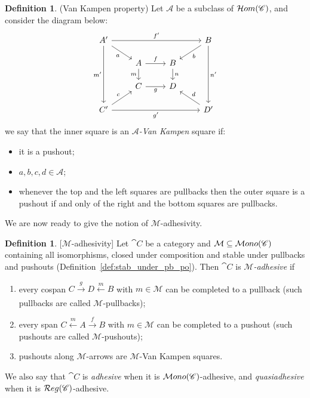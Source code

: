 \documentclass[a4paper, twoside,openright]{report}
\theoremstyle{plain}
\theoremstyle{definition}
\newtheorem{definition}[theorem]{Definition}
\begin{document}
\begin{definition}(Van Kampen property)
    Let $\mathcal A$ be a subclass of $\mathcal{H}om(\mathscr{C})$, and consider the diagram below:
    \[
    \begin{tikzcd}[row sep = scriptsize]
        A' \arrow[ddd, "m'"swap] \arrow[rrr, "f'"] \arrow[dr, "a"swap] & & & B \arrow[ddd, "n'"] \arrow[dl, "b"] \\
        & A \arrow[r, "f"] \arrow[d, "m" swap] & B \arrow[d, "n"]   & \\
        & C \arrow[r, "g" swap]                & D                  & \\
        C' \arrow[rrr, "g'"swap] \arrow[ur, "c"] & & & D' \arrow[ul, "d" swap] 
    \end{tikzcd}
    \]
    we say that the inner square is an \emph{$\mathcal A$-Van Kampen} square if:
    \begin{itemize}
        \item it is a pushout;
        \item $a, b, c, d \in \mathcal{A}$;
        \item whenever the top and the left squares are pullbacks then the outer square is a pushout if and only of the right and the bottom squares are pullbacks.
    \end{itemize}
\end{definition}

We are now ready to give the notion of $\mathcal M$-adhesivity. %

\begin{definition}\label{def:adh}[$\mathcal{M}$-adhesivity]
    Let $\cat C$ be a category and $\mathcal M \subseteq \mathcal{M}ono(\mathscr{C})$ containing all isomorphisms, closed under composition and stable under pullbacks and pushouts (Definition~\ref{def:stab_under_pb_po}).
    Then $\cat C$ is \emph{$\mathcal M$-adhesive} if
    \begin{enumerate}
        \item every cospan $C \xrightarrow[]{g} D \xleftarrow[]{m} B$ with $m \in \mathcal M$ can be completed to a pullback (such pullbacks are called $\mathcal M$-pullbacks);
        \item every span $C \xleftarrow{m} A \xrightarrow{f} B$ with $ m \in \mathcal M$ can be completed to a pushout (such pushouts are called $\mathcal M$-pushouts);
        \item pushouts along $\mathcal M$-arrows are $\mathcal M$-Van Kampen squares.
    \end{enumerate}
    We also say that $\cat C$ is \emph{adhesive} when it is $\mathcal{M}ono(\mathscr{C})$-adhesive, and \emph{quasiadhesive} when it is $\mathcal{R}eg(\mathscr{C})$-adhesive.
\end{definition}
\end{document}
